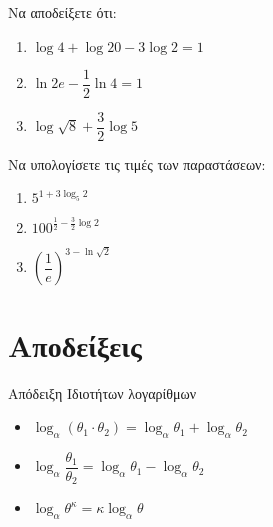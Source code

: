 \documentclass[greek]{beamer}
\begin{document}
\begin{askisi}
  Να αποδείξετε ότι:
  \begin{enumerate}
    \item<1-> $\log 4+\log 20-3\log 2=1$
    \item<2-> $\ln 2e-\dfrac{1}{2}\ln 4=1$
    \item<3-> $\log\sqrt{8}+\dfrac{3}{2}\log 5$
  \end{enumerate}


\end{askisi}

\begin{askisi}
  Να υπολογίσετε τις τιμές των παραστάσεων:
  \begin{enumerate}
    \item<1-> $5^{1+3\log_5 2}$
    \item<2-> $100^{\frac{1}{2}-\frac{3}{2}\log 2}$
    \item<3-> $\left( \dfrac{1}{e} \right)^{3-\ln \sqrt{2}} $
  \end{enumerate}


\end{askisi}

\appendix

\section{Αποδείξεις}
\begin{frame}[label=Απόδειξη1,t]{Απόδειξη Ιδιοτήτων λογαρίθμων}

  \begin{itemize}
    \item<1-> $\log_α\left( θ_1\cdot θ_2 \right)=\log_αθ_1+\log_αθ_2 $
    \item<3-> $\log_α\dfrac{θ_1}{θ_2}=\log_αθ_1-\log_αθ_2 $
    \item<4-> $\log_αθ^κ=κ\log_αθ$
  \end{itemize}



  \hyperlink{Ιδιότητες}{}
\end{frame}
\end{document}

